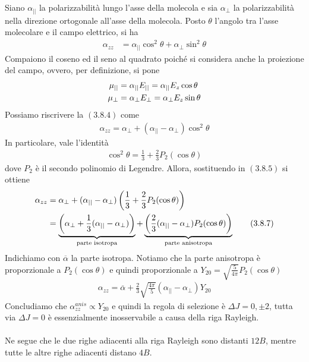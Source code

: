 \documentclass{article}
\begin{document}
Siano $\alpha_{||}$ la polarizzabilità lungo l'asse della molecola e sia $\alpha_\perp$ la polarizzabilità nella direzione ortogonale all'asse della molecola. Posto $\theta$ l'angolo tra l'asse molecolare e il campo elettrico, si ha 
\begin{align}
    \alpha_{zz} &= \alpha_{||}\cos^2\theta + \alpha_\perp\sin^2\theta \tag{3.8.4}
\end{align}
Compaiono il coseno ed il seno al quadrato poiché si considera anche la proiezione del campo, ovvero, per definizione, si pone 
\begin{align}
    \mu_{||} &= \alpha_{||}E_{||} = \alpha_{||}E_z\cos\theta \notag \\
    \mu_\perp &= \alpha_\perp E_\perp = \alpha_\perp E_z\sin\theta \notag
\end{align}
Possiamo riscrivere la $(3.8.4)$ come 
\begin{align}
    \alpha_{zz} = \alpha_\perp + (\alpha_{||} - \alpha_\perp)\cos^2\theta \tag{3.8.5}
\end{align}
In particolare, vale l'identità
\begin{align}
    \cos^2\theta = \frac{1}{3} + \frac{2}{3}P_2(\cos\theta) \tag{3.8.6}
\end{align}
dove $P_2$ è il secondo polinomio di Legendre. Allora, sostituendo in $(3.8.5)$ si ottiene 
\begin{align}
    \alpha_{zz} &= \alpha_\perp + (\alpha_{||} - \alpha_\perp)\left(\frac{1}{3} + \frac{2}{3}P_2(\cos\theta)\right) \notag \\
    &= \underbrace{\left(\alpha_\perp + \frac{1}{3}(\alpha_{||} - \alpha_\perp)\right)}_{\text{parte isotropa}} + \underbrace{\left(\frac{2}{3}(\alpha_{||} - \alpha_\perp)P_2(\cos\theta)\right)}_{\text{parte anisotropa}} \tag{3.8.7}
\end{align}
Indichiamo con $\overline{\alpha}$ la parte isotropa. Notiamo che la parte anisotropa è proporzionale a $P_2(\cos\theta)$ e quindi proporzionale a $Y_{20} = \sqrt{\frac{5}{4\pi}}P_2(\cos\theta)$
\begin{align}
    \alpha_{zz} = \overline{\alpha} + \frac{2}{3}\sqrt{\frac{4\pi}{5}}(\alpha_{||} - \alpha_\perp)Y_{20} \tag{3.8.8}
\end{align}
Concludiamo che $\alpha^{anis}_{zz} \propto Y_{20}$ e quindi la regola di selezione è $\Delta J = 0, \pm 2$, tutta via $\Delta J = 0$ è essenzialmente inosservabile a causa della riga Rayleigh. \\ \\
Ne segue che le due righe adiacenti alla riga Rayleigh sono distanti $12B$, mentre tutte le altre righe adiacenti distano $4B$.
\end{document}
